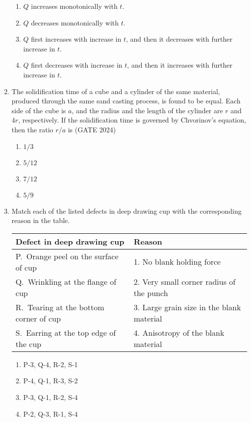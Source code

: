 \documentclass[journal,12pt,onecolumn]{IEEEtran}
\theoremstyle{remark}
\begin{document}
\begin{enumerate}
\begin{enumerate}
    \item $Q$ increases monotonically with $t$.
    \item $Q$ decreases monotonically with $t$.
    \item $Q$ first increases with increase in $t$, and then it decreases with further increase in $t$.
    \item $Q$ first decreases with increase in $t$, and then it increases with further increase in $t$.
\end{enumerate}

\vspace{1cm}
\item The solidification time of a cube and a cylinder of the same material, produced through the same sand casting process, is found to be equal. Each side of the cube is $a$, and the radius and the length of the cylinder are $r$ and $4r$, respectively. If the solidification time is governed by Chvorinov's equation, then the ratio $r/a$ is
\hfill{(GATE 2024)}
\begin{multicols}{4}
\begin{enumerate}
    \item $1/3$
    \item $5/12$
    \item $7/12$
    \item $5/9$
\end{enumerate}
\end{multicols}
\vspace{1cm}

\item Match each of the listed defects in deep drawing cup with the corresponding reason in the table.
\begin{center}
\begin{tabular}{|l|l|}
\hline
\textbf{Defect in deep drawing cup} & \textbf{Reason} \\
\hline
P.~Orange peel on the surface of cup   & 1. No blank holding force \\
Q.~Wrinkling at the flange of cup      & 2. Very small corner radius of the punch \\
R.~Tearing at the bottom corner of cup & 3. Large grain size in the blank material \\
S.~Earring at the top edge of the cup  & 4. Anisotropy of the blank material \\
\hline
\end{tabular}
\end{center}
\begin{multicols}{4}
\begin{enumerate}
    \item P-3, Q-4, R-2, S-1
    \item P-4, Q-1, R-3, S-2
    \item P-3, Q-1, R-2, S-4
    \item P-2, Q-3, R-1, S-4
\end{enumerate}
\end{multicols}
\vspace{1cm}


\end{enumerate}
\end{document}
